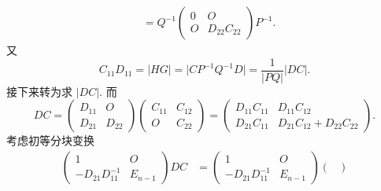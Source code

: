 \begin{enumerate}
\begin{enumerate}
\begin{enumerate}
\begin{align*}
                                    & = Q^{-1} \begin{pmatrix}
                                                   0 & O            \\
                                                   O & D_{22}C_{22}
                                               \end{pmatrix} P^{-1}.
                              \end{align*}
                              又
                              \[C_{11}D_{11} = \lvert HG \rvert = \lvert CP^{-1}Q^{-1}D \rvert = \dfrac{1}{\lvert PQ \rvert}\lvert DC \rvert.\]
                              接下来转为求 $\lvert DC \rvert$. 而
                              \[DC = \begin{pmatrix}
                                      D_{11} & O      \\
                                      D_{21} & D_{22}
                                  \end{pmatrix} \begin{pmatrix}
                                      C_{11} & C_{12} \\
                                      O      & C_{22}
                                  \end{pmatrix} = \begin{pmatrix}
                                      D_{11}C_{11} & D_{11}C_{12}              \\
                                      D_{21}C_{11} & D_{21}C_{12}+D_{22}C_{22}
                                  \end{pmatrix}.\]
                              考虑初等分块变换
                              \begin{align*}
                                  \begin{pmatrix}
                                      1                  & O       \\
                                      -D_{21}D_{11}^{-1} & E_{n-1}
                                  \end{pmatrix}DC
                                   & = \begin{pmatrix}
                                           1                  & O       \\
                                           -D_{21}D_{11}^{-1} & E_{n-1}
                                       \end{pmatrix}
                                  \begin{pmatrix}

\end{pmatrix}
\end{align*}
\end{enumerate}
\end{enumerate}
\end{enumerate}
